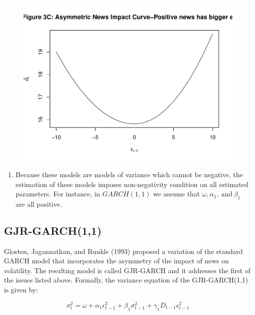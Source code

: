 \documentclass[]{book}
\providecommand{\tightlist}{%
  \setlength{\itemsep}{0pt}\setlength{\parskip}{0pt}}
\theoremstyle{definition}
\theoremstyle{definition}
\theoremstyle{definition}
\theoremstyle{remark}
\begin{document}
\begin{figure}

{\centering \includegraphics[width=1\linewidth]{bookdown-demo_files/figure-latex/ch7-figure2-3} 

}

\end{figure}

\begin{enumerate}
\def\labelenumi{\arabic{enumi}.}
\setcounter{enumi}{1}
\tightlist
\item
  Because these models are models of variance which cannot be negative, the estimation of these models imposes non-negativity condition on all estimated parameters. For instance, in \(GARCH(1,1)\) we assume that \(\omega, \alpha_1, \ \text{and} \ \beta_1\) are all positive.
\end{enumerate}

\hypertarget{gjr-garch11}{%
\subsection{GJR-GARCH(1,1)}\label{gjr-garch11}}

Glosten, Jagannathan, and Runkle (1993) proposed a variation of the standard GARCH model that incorporates the asymmetry of the impact of news on volatility. The resulting model is called GJR-GARCH and it addresses the first of the issues listed above. Formally, the variance equation of the GJR-GARCH(1,1) is given by:

\[ \sigma_t^2=\omega+\alpha_1 \epsilon^2_{t-1}+\beta_1 \sigma^2_{t-1}+\gamma_1 D_{t-1}\epsilon^2_{t-1}\]
\end{document}
